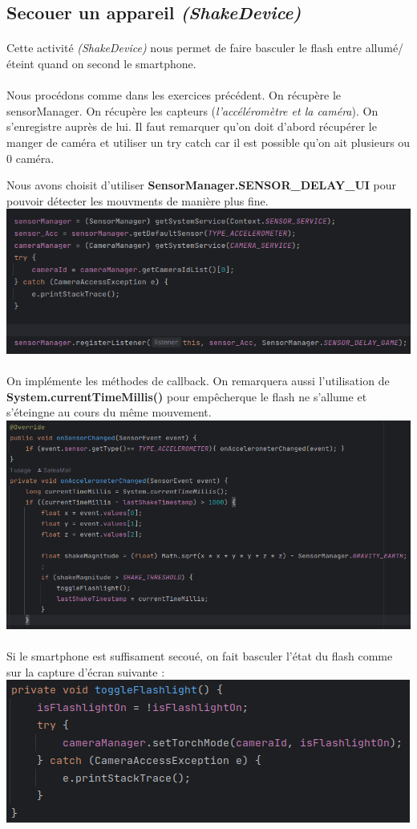 \documentclass[a4paper]{article}
\begin{document}
\begin{multicols}{2}
        \section{Secouer un appareil \emph{(ShakeDevice)}}
            \paragraph{}
                Cette activité \emph{(ShakeDevice)} nous permet de faire basculer le flash entre allumé/éteint quand on second le smartphone.
            \paragraph{}
                Nous procédons comme dans les exercices précédent. On récupère le sensorManager. On récupère les capteurs (\emph{l'accéléromètre et la caméra}). On s'enregistre auprès de lui. Il faut remarquer qu'on doit d'abord récupérer le manger de caméra et utiliser un try catch car il est possible qu'on ait plusieurs ou 0 caméra.

                Nous avons choisit d'utiliser \textbf{SensorManager.SENSOR\_DELAY\_UI} pour pouvoir détecter les mouvments de manière plus fine.
                \includegraphics[width=.49\textwidth]{shake/register}
            \paragraph{}
                On implémente les méthodes de callback. On remarquera aussi l'utilisation de \textbf{System.currentTimeMillis()} pour empêcherque le flash ne s'allume et s'éteingne au cours du même mouvement.
                \includegraphics[width=.49\textwidth]{shake/onSensorChanged}
            \paragraph{}
                Si le smartphone est suffisament secoué, on fait basculer l'état du flash comme sur la capture d'écran suivante :
                \includegraphics[width=.49\textwidth]{shake/toggle}

\end{multicols}
\end{document}
